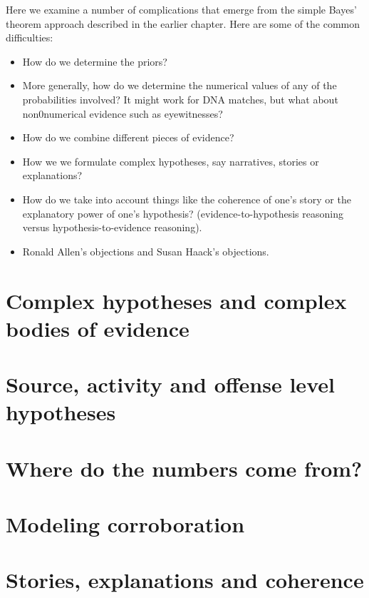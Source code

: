 \documentclass[]{book}
\begin{document}
Here we examine a number of complications that emerge from the simple
Bayes' theorem approach described in the earlier chapter. Here are some
of the common difficulties:

\begin{itemize}
 
 \item How do we determine the priors?
 
 \item More generally, how do we determine the numerical 
 values of any of the probabilities involved? 
 It might work for DNA matches, but what about non0numerical evidence 
 such as eyewitnesses? 
 
 \item How do we combine different pieces of evidence?  
 
 \item How we we formulate complex hypotheses, 
 say narratives, stories or explanations? 
 
 \item How do we take into account things 
 like the coherence of one's story or 
 the explanatory power of one's hypothesis?
 (evidence-to-hypothesis reasoning 
 versus hypothesis-to-evidence reasoning).
 
 \item Ronald Allen's objections 
 and Susan Haack's objections. 
 
 \end{itemize}

\section{Complex hypotheses and complex bodies of evidence}

\section{Source, activity and offense level hypotheses}

\section{Where do the numbers come from?}

\section{Modeling corroboration}

\section{Stories, explanations and coherence}
\end{document}
